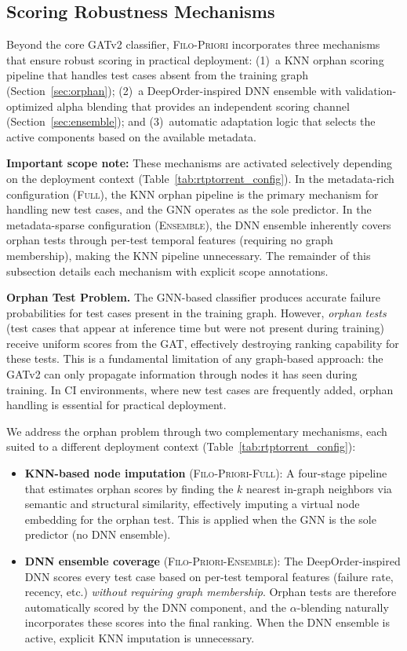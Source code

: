 \documentclass[10pt,journal,compsoc]{IEEEtran}
\newcommand{\filopriori}{\textsc{Filo-Priori}}
\begin{document}
\subsection{Scoring Robustness Mechanisms}
\label{sec:deployment}

Beyond the core GATv2 classifier, \filopriori{} incorporates three
mechanisms that ensure robust scoring in practical deployment: (1)~a KNN
orphan scoring pipeline that handles test cases absent from the training
graph (Section~\ref{sec:orphan}); (2)~a DeepOrder-inspired DNN ensemble
with validation-optimized alpha blending that provides an independent
scoring channel (Section~\ref{sec:ensemble}); and (3)~automatic adaptation
logic that selects the active components based on the available metadata.

\textbf{Important scope note:} These mechanisms are activated selectively
depending on the deployment context
(Table~\ref{tab:rtptorrent_config}). In the metadata-rich configuration
(\textsc{Full}), the KNN orphan pipeline is the primary mechanism for
handling new test cases, and the GNN operates as the sole predictor. In
the metadata-sparse configuration (\textsc{Ensemble}), the DNN ensemble
inherently covers orphan tests through per-test temporal features
(requiring no graph membership), making the KNN pipeline unnecessary.
The remainder of this subsection details each mechanism with explicit
scope annotations.

\textbf{Orphan Test Problem.}
The GNN-based classifier produces accurate failure probabilities for test
cases present in the training graph. However, \emph{orphan tests} (test
cases that appear at inference time but were not present during
training) receive uniform scores from the GAT, effectively destroying
ranking capability for these tests. This is a fundamental limitation of any
graph-based approach: the GATv2 can only propagate information through nodes
it has seen during training. In CI environments, where new test cases are
frequently added, orphan handling is essential for practical deployment.

We address the orphan problem through two complementary mechanisms, each
suited to a different deployment context
(Table~\ref{tab:rtptorrent_config}):
\begin{itemize}
    \item \textbf{KNN-based node imputation}
    (\textsc{Filo-Priori-Full}): A four-stage pipeline that estimates
    orphan scores by finding the $k$ nearest in-graph neighbors via semantic
    and structural similarity, effectively imputing a virtual node
    embedding for the orphan test. This is applied when the GNN is the
    sole predictor (no DNN ensemble).
    \item \textbf{DNN ensemble coverage}
    (\textsc{Filo-Priori-Ensemble}): The DeepOrder-inspired DNN scores
    every test case based on per-test temporal features (failure rate,
    recency, etc.) \emph{without requiring graph membership}. Orphan tests
    are therefore automatically scored by the DNN component, and the
    $\alpha$-blending naturally incorporates these scores into the final
    ranking. When the DNN ensemble is active, explicit KNN imputation is
    unnecessary.
\end{itemize}
\end{document}
